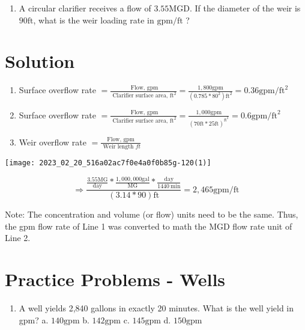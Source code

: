 \documentclass[10pt]{article}
\begin{document}
\begin{enumerate}
\begin{enumerate}
\begin{enumerate}
  \item A circular clarifier receives a flow of $3.55 \mathrm{MGD}$. If the diameter of the weir is $90 \mathrm{ft}$, what is the weir loading rate in $\mathrm{gpm} / \mathrm{ft}$ ?

\end{enumerate}

\section{Solution}
\begin{enumerate}
  \item Surface overflow rate $=\frac{\text { Flow, } \mathrm{gpm}}{\text { Clarifier surface area, } \mathrm{ft}^{2}}=\frac{1,800 \mathrm{gpm}}{\left(0.785 * 80^{2}\right) \mathrm{ft}^{2}}=0.36 \mathrm{gpm} / \mathrm{ft}^{2}$

  \item Surface overflow rate $=\frac{\text { Flow, } \mathrm{gpm}}{\text { Clarifier surface area, } \mathrm{ft}^{2}}=\frac{1,000 \mathrm{gpm}}{(70 \mathrm{ft} * 25 \mathrm{ft})^{\mathrm{ft}^{2}}}=0.6 \mathrm{gpm} / \mathrm{ft}^{2}$

  \item Weir overflow rate $=\frac{\text { Flow, gpm }}{\text { Weir length } f t}$

\end{enumerate}

\begin{center}
\texttt{[image: 2023\_02\_20\_516a02ac7f0e4a0f0b85g-120(1)]}
\end{center}

$$
\Longrightarrow \frac{\frac{3.55 \mathrm{MG}}{\text { day }} * \frac{1,000,000 \mathrm{gal}}{\mathrm{MG}} * \frac{\mathrm{day}}{1440 \mathrm{~min}}}{(3.14 * 90) \mathrm{ft}}=2,465 \mathrm{gpm} / \mathrm{ft}
$$

Note: The concentration and volume (or flow) units need to be the same. Thus, the gpm flow rate of Line 1 was converted to math the MGD flow rate unit of Line 2.

\section{Practice Problems - Wells}
\begin{enumerate}
  \item A well yields 2,840 gallons in exactly 20 minutes. What is the well yield in gpm?
a. $140 \mathrm{gpm}$
b. $142 \mathrm{gpm}$
c. $145 \mathrm{gpm}$ d. $150 \mathrm{gpm}$


\end{enumerate}
\end{enumerate}
\end{enumerate}
\end{document}
